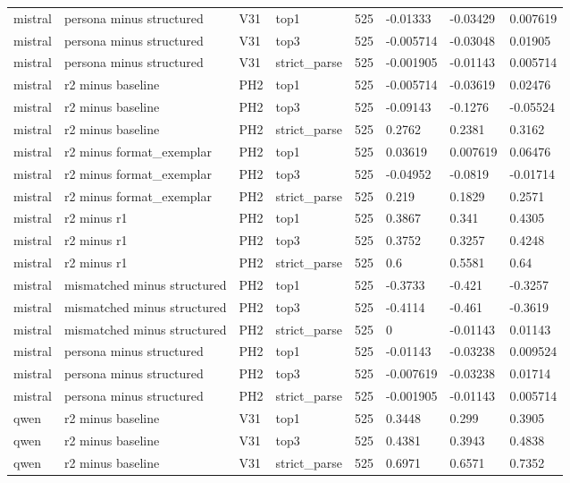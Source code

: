 \begin{tabular}{llllllll}
mistral & persona minus structured & V31 & top1 & 525 & -0.01333 & -0.03429 & 0.007619 \\
mistral & persona minus structured & V31 & top3 & 525 & -0.005714 & -0.03048 & 0.01905 \\
mistral & persona minus structured & V31 & strict\_parse & 525 & -0.001905 & -0.01143 & 0.005714 \\
mistral & r2 minus baseline & PH2 & top1 & 525 & -0.005714 & -0.03619 & 0.02476 \\
mistral & r2 minus baseline & PH2 & top3 & 525 & -0.09143 & -0.1276 & -0.05524 \\
mistral & r2 minus baseline & PH2 & strict\_parse & 525 & 0.2762 & 0.2381 & 0.3162 \\
mistral & r2 minus format\_exemplar & PH2 & top1 & 525 & 0.03619 & 0.007619 & 0.06476 \\
mistral & r2 minus format\_exemplar & PH2 & top3 & 525 & -0.04952 & -0.0819 & -0.01714 \\
mistral & r2 minus format\_exemplar & PH2 & strict\_parse & 525 & 0.219 & 0.1829 & 0.2571 \\
mistral & r2 minus r1 & PH2 & top1 & 525 & 0.3867 & 0.341 & 0.4305 \\
mistral & r2 minus r1 & PH2 & top3 & 525 & 0.3752 & 0.3257 & 0.4248 \\
mistral & r2 minus r1 & PH2 & strict\_parse & 525 & 0.6 & 0.5581 & 0.64 \\
mistral & mismatched minus structured & PH2 & top1 & 525 & -0.3733 & -0.421 & -0.3257 \\
mistral & mismatched minus structured & PH2 & top3 & 525 & -0.4114 & -0.461 & -0.3619 \\
mistral & mismatched minus structured & PH2 & strict\_parse & 525 & 0 & -0.01143 & 0.01143 \\
mistral & persona minus structured & PH2 & top1 & 525 & -0.01143 & -0.03238 & 0.009524 \\
mistral & persona minus structured & PH2 & top3 & 525 & -0.007619 & -0.03238 & 0.01714 \\
mistral & persona minus structured & PH2 & strict\_parse & 525 & -0.001905 & -0.01143 & 0.005714 \\
qwen & r2 minus baseline & V31 & top1 & 525 & 0.3448 & 0.299 & 0.3905 \\
qwen & r2 minus baseline & V31 & top3 & 525 & 0.4381 & 0.3943 & 0.4838 \\
qwen & r2 minus baseline & V31 & strict\_parse & 525 & 0.6971 & 0.6571 & 0.7352 \\

\end{tabular}
